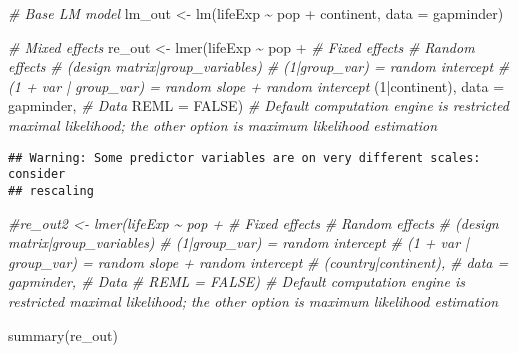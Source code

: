 \documentclass[
]{book}
\newenvironment{Shaded}{\begin{snugshade}}{\end{snugshade}}
\newcommand{\AttributeTok}[1]{\textcolor[rgb]{0.77,0.63,0.00}{#1}}
\newcommand{\CommentTok}[1]{\textcolor[rgb]{0.56,0.35,0.01}{\textit{#1}}}
\newcommand{\ConstantTok}[1]{\textcolor[rgb]{0.00,0.00,0.00}{#1}}
\newcommand{\DecValTok}[1]{\textcolor[rgb]{0.00,0.00,0.81}{#1}}
\newcommand{\FunctionTok}[1]{\textcolor[rgb]{0.00,0.00,0.00}{#1}}
\newcommand{\NormalTok}[1]{#1}
\newcommand{\OtherTok}[1]{\textcolor[rgb]{0.56,0.35,0.01}{#1}}
\newcommand{\SpecialCharTok}[1]{\textcolor[rgb]{0.00,0.00,0.00}{#1}}
\begin{document}
\begin{Shaded}
\begin{Highlighting}[]
\CommentTok{\# Base LM model }
\NormalTok{lm\_out }\OtherTok{\textless{}{-}} \FunctionTok{lm}\NormalTok{(lifeExp }\SpecialCharTok{\textasciitilde{}}\NormalTok{ pop }\SpecialCharTok{+}\NormalTok{ continent, }
             \AttributeTok{data =}\NormalTok{ gapminder)}

\CommentTok{\# Mixed effects }
\NormalTok{re\_out }\OtherTok{\textless{}{-}} \FunctionTok{lmer}\NormalTok{(lifeExp }\SpecialCharTok{\textasciitilde{}}\NormalTok{ pop }\SpecialCharTok{+} \CommentTok{\# Fixed effects}
                \CommentTok{\# Random effects }
                \CommentTok{\# (design matrix|group\_variables)}
                \CommentTok{\# (1|group\_var) = random intercept }
                \CommentTok{\# (1 + var | group\_var) = random slope + random intercept }
\NormalTok{               (}\DecValTok{1}\SpecialCharTok{|}\NormalTok{continent),}
               \AttributeTok{data =}\NormalTok{ gapminder, }\CommentTok{\# Data }
               \AttributeTok{REML =} \ConstantTok{FALSE}\NormalTok{) }\CommentTok{\# Default computation engine is restricted maximal likelihood; the other option is maximum likelihood estimation }
\end{Highlighting}
\end{Shaded}

\begin{verbatim}
## Warning: Some predictor variables are on very different scales: consider
## rescaling
\end{verbatim}

\begin{Shaded}
\begin{Highlighting}[]
\CommentTok{\#re\_out2 \textless{}{-} lmer(lifeExp \textasciitilde{} pop + \# Fixed effects}
                \CommentTok{\# Random effects }
                \CommentTok{\# (design matrix|group\_variables)}
                \CommentTok{\# (1|group\_var) = random intercept }
                \CommentTok{\# (1 + var | group\_var) = random slope + random intercept }
 \CommentTok{\#              (country|continent),}
  \CommentTok{\#             data = gapminder, \# Data }
   \CommentTok{\#            REML = FALSE) \# Default computation engine is restricted maximal likelihood; the other option is maximum likelihood estimation }

\FunctionTok{summary}\NormalTok{(re\_out)}
\end{Highlighting}
\end{Shaded}
\end{document}
